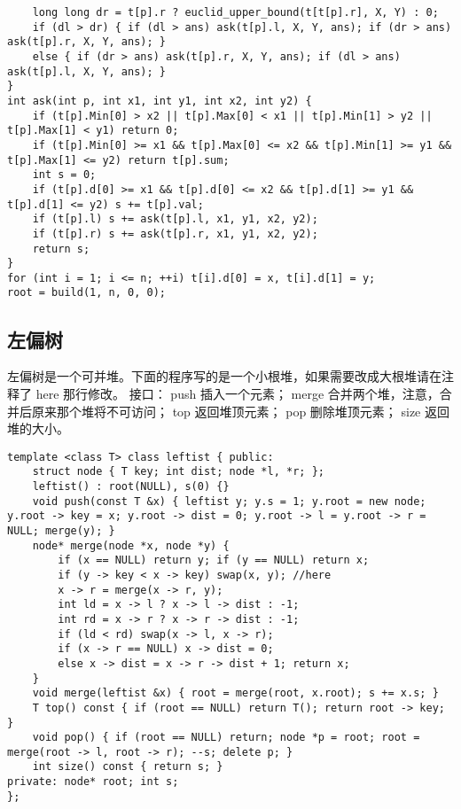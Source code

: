 \documentclass[landscape,a4paper]{article}
\begin{document}
\begin{lstlisting}
	long long dr = t[p].r ? euclid_upper_bound(t[t[p].r], X, Y) : 0;
	if (dl > dr) { if (dl > ans) ask(t[p].l, X, Y, ans); if (dr > ans) ask(t[p].r, X, Y, ans); }
	else { if (dr > ans) ask(t[p].r, X, Y, ans); if (dl > ans) ask(t[p].l, X, Y, ans); }
}
int ask(int p, int x1, int y1, int x2, int y2) {
	if (t[p].Min[0] > x2 || t[p].Max[0] < x1 || t[p].Min[1] > y2 || t[p].Max[1] < y1) return 0;
	if (t[p].Min[0] >= x1 && t[p].Max[0] <= x2 && t[p].Min[1] >= y1 && t[p].Max[1] <= y2) return t[p].sum;
	int s = 0;
	if (t[p].d[0] >= x1 && t[p].d[0] <= x2 && t[p].d[1] >= y1 && t[p].d[1] <= y2) s += t[p].val;
	if (t[p].l) s += ask(t[p].l, x1, y1, x2, y2);
	if (t[p].r) s += ask(t[p].r, x1, y1, x2, y2);
	return s;
}
for (int i = 1; i <= n; ++i) t[i].d[0] = x, t[i].d[1] = y;
root = build(1, n, 0, 0);
\end{lstlisting}

\subsection{左偏树}

左偏树是一个可并堆。下面的程序写的是一个小根堆，如果需要改成大根堆请在注释了 here 那行修改。
接口：
 push 插入一个元素；
 merge 合并两个堆，注意，合并后原来那个堆将不可访问；
 top 返回堆顶元素；
 pop 删除堆顶元素；
 size 返回堆的大小。

\begin{lstlisting}
template <class T> class leftist { public:
	struct node { T key; int dist; node *l, *r; };
	leftist() : root(NULL), s(0) {}
	void push(const T &x) { leftist y; y.s = 1; y.root = new node; y.root -> key = x; y.root -> dist = 0; y.root -> l = y.root -> r = NULL; merge(y); }
	node* merge(node *x, node *y) {
		if (x == NULL) return y; if (y == NULL) return x;
		if (y -> key < x -> key) swap(x, y); //here
		x -> r = merge(x -> r, y);
		int ld = x -> l ? x -> l -> dist : -1;
		int rd = x -> r ? x -> r -> dist : -1;
		if (ld < rd) swap(x -> l, x -> r);
		if (x -> r == NULL) x -> dist = 0;
		else x -> dist = x -> r -> dist + 1; return x;
	}
	void merge(leftist &x) { root = merge(root, x.root); s += x.s; }
	T top() const { if (root == NULL) return T(); return root -> key; }
	void pop() { if (root == NULL) return; node *p = root; root = merge(root -> l, root -> r); --s; delete p; }
	int size() const { return s; }
private: node* root; int s;
};
\end{lstlisting}
\end{document}

